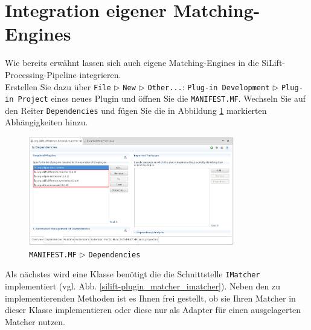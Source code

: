 \section{Integration eigener Matching-Engines} \label{sec:own_matching_engine}

Wie bereits erwähnt lassen sich auch eigene Matching-Engines in die SiLift-Processing-Pipeline integrieren.\\
Erstellen Sie dazu über \texttt{File} $\triangleright$ \texttt{New} $\triangleright$ \texttt{Other...}: \texttt{Plug-in Development} $\triangleright$ \texttt{Plug-in Project} eines neues Plugin und öffnen Sie die \texttt{MANIFEST.MF}.
Wechseln Sie auf den Reiter \texttt{Dependencies} und fügen Sie die in Abbildung \ref{silift-plugin_matcher_manifest_dependencies} markierten Abhängigkeiten hinzu.

\begin{figure}[H]
\centering
\includegraphics[width=0.8\textwidth]{matching/graphics/silift-plugin_matcher_manifest_dependencies}
\caption{\texttt{MANIFEST.MF} $\triangleright$ \texttt{Dependencies}}
\label{silift-plugin_matcher_manifest_dependencies}
\end{figure}

Als nächstes wird eine Klasse benötigt die die Schnittstelle \texttt{IMatcher} implementiert (vgl. Abb. \ref{silift-plugin_matcher_imatcher}).
Neben den zu implementierenden Methoden ist es Ihnen frei gestellt, ob sie Ihren Matcher in dieser Klasse implementieren oder diese nur als Adapter für einen ausgelagerten Matcher nutzen.

